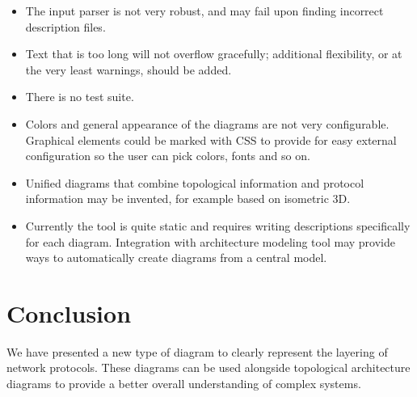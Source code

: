 \documentclass{article}
\begin{document}
\begin{itemize}
	\item The input parser is not very robust, and may fail upon finding incorrect description files.
	\item Text that is too long will not overflow gracefully; additional flexibility, or at the very least warnings, should be added.
	\item There is no test suite.
	\item Colors and general appearance of the diagrams are not very configurable. Graphical elements could be marked with CSS to provide for easy external configuration so the user can pick colors, fonts and so on.
	\item Unified diagrams that combine topological information and protocol information may be invented, for example based on isometric 3D.
	\item Currently the tool is quite static and requires writing descriptions specifically for each diagram.  Integration with architecture modeling tool may provide ways to automatically create diagrams from a central model.
\end{itemize}



\section{Conclusion}

We have presented a new type of diagram to clearly represent the layering of network protocols. These diagrams can be used alongside topological architecture diagrams to provide a better overall understanding of complex systems.
\end{document}
